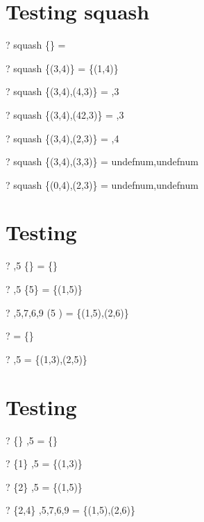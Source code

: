 \documentclass{article}
\begin{document}
\section{Testing squash}
\begin{zed} \vdash? squash \{\} = \langle \rangle \end{zed}
\begin{zed} \vdash? squash \{(3,4)\} = \{(1,4)\} \end{zed}
\begin{zed} \vdash? squash \{(3,4),(4,3)\} = ,3 \rangle \end{zed}
\begin{zed} \vdash? squash \{(3,4),(42,3)\} = ,3 \rangle \end{zed}
\begin{zed} \vdash? squash \{(3,4),(2,3)\} = ,4 \rangle \end{zed}
\begin{zed} \vdash? squash \{(3,4),(3,3)\} = \langle undefnum,undefnum \rangle \end{zed}
\begin{zed} \vdash? squash \{(0,4),(2,3)\} = \langle undefnum,undefnum \rangle \end{zed}

\section{Testing \filter}
\begin{zed} \vdash? ,5 \rangle \filter \{\} = \{\} \end{zed}
\begin{zed} \vdash? ,5 \rangle \filter \{5\} = \{(1,5)\} \end{zed}
\begin{zed} \vdash? ,5,7,6,9 \rangle \filter (5 ) = \{(1,5),(2,6)\} \end{zed}
\begin{zed} \vdash? \langle \rangle \filter \nat = \{\} \end{zed}
\begin{zed} \vdash? ,5 \rangle \filter \nat = \{(1,3),(2,5)\} \end{zed}

\section{Testing \filter}
\begin{zed} \vdash? \{\} \extract {},5 \rangle = \{\} \end{zed}
\begin{zed} \vdash? \{1\} \extract {},5 \rangle = \{(1,3)\} \end{zed}
\begin{zed} \vdash? \{2\} \extract {},5 \rangle = \{(1,5)\} \end{zed}
\begin{zed} \vdash? \{2,4\} \extract {},5,7,6,9 \rangle = \{(1,5),(2,6)\} \end{zed}
\end{document}
